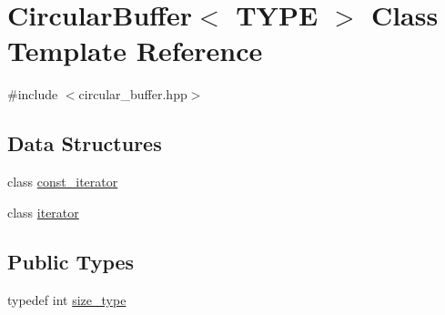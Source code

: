 \hypertarget{classCircularBuffer}{}\section{Circular\+Buffer$<$ T\+Y\+PE $>$ Class Template Reference}
\label{classCircularBuffer}


{\ttfamily \#include $<$circular\+\_\+buffer.\+hpp$>$}

\subsection*{Data Structures}
\begin{DoxyCompactItemize}
\item 
class \hyperlink{classCircularBuffer_1_1const__iterator}{const\+\_\+iterator}
\item 
class \hyperlink{classCircularBuffer_1_1iterator}{iterator}
\end{DoxyCompactItemize}
\subsection*{Public Types}
\begin{DoxyCompactItemize}
\item 
typedef int \hyperlink{classCircularBuffer_a2030ed25523469c9401f82aff85f7020}{size\+\_\+type}
\end{DoxyCompactItemize}
